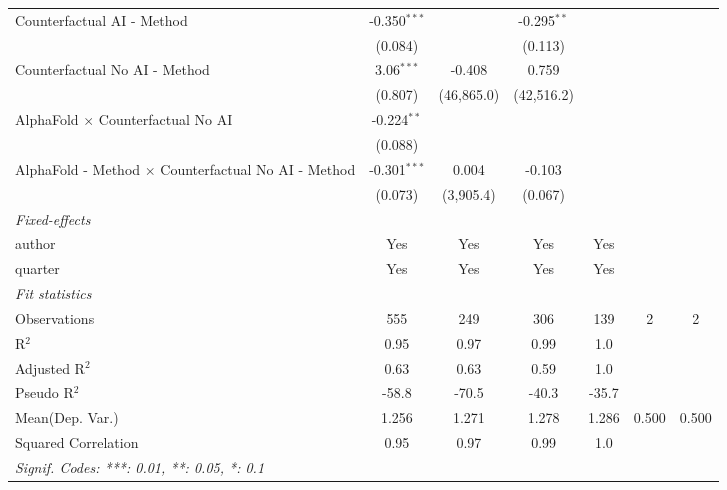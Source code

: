\begin{tabular}{lcccccc}
   Counterfactual AI - Method                                 & -0.350$^{***}$ &              & -0.295$^{**}$ &                &     &   \\   
                                                              & (0.084)        &              & (0.113)       &                &     &   \\   
   Counterfactual No AI - Method                              & 3.06$^{***}$   & -0.408       & 0.759         &                &     &   \\   
                                                              & (0.807)        & (46,865.0)   & (42,516.2)    &                &     &   \\   
   AlphaFold $\times$ Counterfactual No AI                    & -0.224$^{**}$  &              &               &                &     &   \\   
                                                              & (0.088)        &              &               &                &     &   \\   
   AlphaFold - Method $\times$ Counterfactual No AI - Method  & -0.301$^{***}$ & 0.004        & -0.103        &                &     &   \\   
                                                              & (0.073)        & (3,905.4)    & (0.067)       &                &     &   \\   
   \midrule
   \emph{Fixed-effects}\\
   author                                                     & Yes            & Yes          & Yes           & Yes            &     & \\  
   quarter                                                    & Yes            & Yes          & Yes           & Yes            &     & \\  
   \midrule
   \emph{Fit statistics}\\
   Observations                                               & 555            & 249          & 306           & 139            & 2   & 2\\  
   R$^2$                                                      & 0.95           & 0.97         & 0.99          & 1.0            &     & \\  
   Adjusted R$^2$                                             & 0.63           & 0.63         & 0.59          & 1.0            &     & \\  
   Pseudo R$^2$                                               & -58.8          & -70.5        & -40.3         & -35.7          &     & \\  
Mean(Dep. Var.) & 1.256 & 1.271 & 1.278 & 1.286 & 0.500 & 0.500 \\
   Squared Correlation                                        & 0.95           & 0.97         & 0.99          & 1.0            &     & \\  
   \midrule \midrule
   \multicolumn{7}{l}{\emph{Signif. Codes: ***: 0.01, **: 0.05, *: 0.1}}\\
\end{tabular}
\par\endgroup
